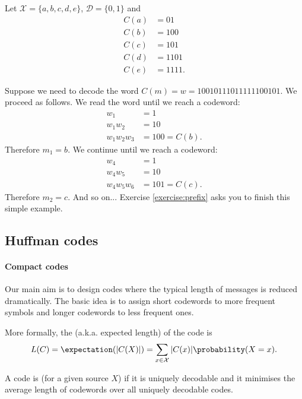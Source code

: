 \documentclass[a4paper, 11pt, openany]{book}
\begin{document}
\begin{example}
Let $\mathcal{X} = \{a, b, c, d, e\}$, $\mathcal{D} = \{0,1\}$ and
\begin{align*}
    C(a) &= 01\\
    C(b) &= 100\\
    C(c) &= 101\\
    C(d) &= 1101\\
    C(e) &= 1111.
\end{align*}

Suppose we need to decode the word $C(m) = w = 10010111011111100101$. We proceed as follows. We read the word until we reach a codeword:
\begin{align*}
    w_1 &= 1\\
    w_1 w_2 &= 10\\
    w_1 w_2 w_3 &= 100 = C(b).
\end{align*}
Therefore $m_1 = b$. We continue until we reach a codeword:
\begin{align*}
    w_4 &= 1\\
    w_4 w_5 &= 10\\
    w_4 w_5 w_6 &= 101 = C(c).
\end{align*}
Therefore $m_2 = c$. And so on... Exercise \ref{exercise:prefix} asks you to finish this simple example.
\end{example}




\subsection{Huffman codes}


\paragraph{Compact codes}

Our main aim is to design codes where the typical length of messages is reduced dramatically. The basic idea is to assign short codewords to more frequent symbols and longer codewords to less frequent ones.


More formally, the  (a.k.a. expected length) of the code is
\[
    L(C) = \expectation( |C(X)| ) = \sum_{x \in \mathcal{X}} |C(x)| \probability(X = x).
\]

A code is  (for a given source $X$) if it is uniquely decodable and it minimises the average length of codewords over all uniquely decodable codes.
\end{document}

